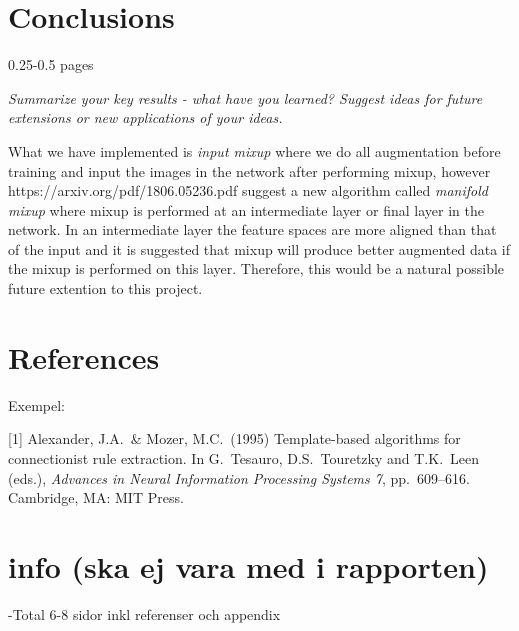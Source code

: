 \documentclass{article}
\begin{document}
\section{Conclusions}

0.25-0.5 pages

\textit{Summarize your key results - what have you learned? Suggest ideas for future extensions or new applications of your ideas.}

What we have implemented is \textit{input mixup} where we do all augmentation before training and input the images in the network after performing mixup, however https://arxiv.org/pdf/1806.05236.pdf 
suggest a new algorithm called \textit{manifold mixup} where mixup is performed at an intermediate layer or final layer in the network. In an intermediate layer 
the feature spaces are more aligned than that of the input and it is suggested that mixup will produce better augmented data if the mixup is performed on this layer. Therefore, this would be 
a natural possible future extention to this project. 


\section*{References}

Exempel:
\medskip

\small

[1] Alexander, J.A.\ \& Mozer, M.C.\ (1995) Template-based algorithms for
connectionist rule extraction. In G.\ Tesauro, D.S.\ Touretzky and T.K.\ Leen
(eds.), {\it Advances in Neural Information Processing Systems 7},
pp.\ 609--616. Cambridge, MA: MIT Press.

\section{info (ska ej vara med i rapporten)}

-Total 6-8 sidor inkl referenser och appendix
\end{document}
